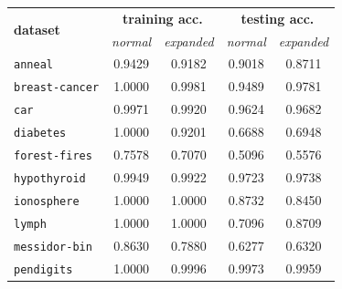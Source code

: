 \documentclass[12pt]{report}
\theoremstyle{definition}
\theoremstyle{definition}
\theoremstyle{definition}
\begin{document}
\begin{table}[ht]
    \centering
    \begin{tabular}{lcccc}
    \hline
    \multicolumn{1}{l}{\multirow{2}{*}{\bf dataset}} & \multicolumn{2}{c}{\bf training acc.} & \multicolumn{2}{c}{\bf testing acc.} \\
    \multicolumn{1}{l}{} & \multicolumn{1}{p{2cm}}{\centering \it normal} & \multicolumn{1}{p{2cm}}{\centering \it expanded} & \multicolumn{1}{p{2cm}}{\centering \it normal} & \multicolumn{1}{p{2cm}}{\centering \it expanded} \\
    \hline
    \multicolumn{1}{l}{\tt anneal}        & \multicolumn{1}{c}{0.9429} & \multicolumn{1}{c}{0.9182} & \multicolumn{1}{c}{0.9018} & \multicolumn{1}{c}{0.8711} \\
    \multicolumn{1}{l}{\tt breast-cancer} & \multicolumn{1}{c}{1.0000} & \multicolumn{1}{c}{0.9981} & \multicolumn{1}{c}{0.9489} & \multicolumn{1}{c}{0.9781} \\
    \multicolumn{1}{l}{\tt car}           & \multicolumn{1}{c}{0.9971} & \multicolumn{1}{c}{0.9920} & \multicolumn{1}{c}{0.9624} & \multicolumn{1}{c}{0.9682} \\
    \multicolumn{1}{l}{\tt diabetes}      & \multicolumn{1}{c}{1.0000} & \multicolumn{1}{c}{0.9201} & \multicolumn{1}{c}{0.6688} & \multicolumn{1}{c}{0.6948} \\
    \multicolumn{1}{l}{\tt forest-fires}  & \multicolumn{1}{c}{0.7578} & \multicolumn{1}{c}{0.7070} & \multicolumn{1}{c}{0.5096} & \multicolumn{1}{c}{0.5576} \\
    \multicolumn{1}{l}{\tt hypothyroid}   & \multicolumn{1}{c}{0.9949} & \multicolumn{1}{c}{0.9922} & \multicolumn{1}{c}{0.9723} & \multicolumn{1}{c}{0.9738} \\
    \multicolumn{1}{l}{\tt ionosphere}    & \multicolumn{1}{c}{1.0000} & \multicolumn{1}{c}{1.0000} & \multicolumn{1}{c}{0.8732} & \multicolumn{1}{c}{0.8450} \\
    \multicolumn{1}{l}{\tt lymph}         & \multicolumn{1}{c}{1.0000} & \multicolumn{1}{c}{1.0000} & \multicolumn{1}{c}{0.7096} & \multicolumn{1}{c}{0.8709} \\
    \multicolumn{1}{l}{\tt messidor-bin}  & \multicolumn{1}{c}{0.8630} & \multicolumn{1}{c}{0.7880} & \multicolumn{1}{c}{0.6277} & \multicolumn{1}{c}{0.6320} \\
    \multicolumn{1}{l}{\tt pendigits}     & \multicolumn{1}{c}{1.0000} & \multicolumn{1}{c}{0.9996} & \multicolumn{1}{c}{0.9973} & \multicolumn{1}{c}{0.9959} \\

\end{tabular}
\end{table}
\end{document}
